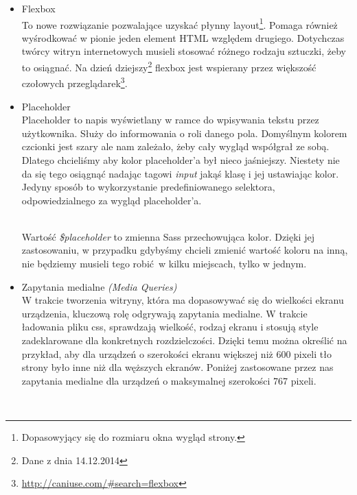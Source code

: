         \begin{itemize}
          \item Flexbox\\
            To nowe rozwiązanie pozwalające uzyskać płynny layout\footnote{Dopasowyjący się do rozmiaru okna wygląd strony.}. Pomaga również wyśrodkować w pionie jeden element HTML względem drugiego. Dotychczas twórcy witryn internetowych musieli stosować różnego rodzaju sztuczki, żeby to osiągnać. Na dzień dziejszy\footnote{Dane z dnia 14.12.2014} flexbox jest wspierany przez większość czołowych przeglądarek\footnote{\url{http://caniuse.com/\#search=flexbox}}. \\
            
            \clearpage
          \item Placeholder\\
            Placeholder to napis wyświetlany w ramce do wpisywania tekstu przez użytkownika. Służy do informowania o roli danego pola. Domyślnym kolorem czcionki jest szary ale nam zależało, żeby cały wygląd współgrał ze sobą. Dlatego chcieliśmy aby kolor placeholder'a był nieco jaśniejszy. Niestety nie da się tego osiągnąć nadając tagowi \emph{input} jakąś klasę i jej ustawiając kolor. Jedyny sposób to wykorzystanie predefiniowanego selektora, odpowiedzialnego za wygląd placeholder'a.

            \begin{code}
              
            \end{code}\\

            Wartość \emph{\$placeholder} to zmienna Sass przechowująca kolor. Dzięki jej zastosowaniu, w przypadku gdybyśmy chcieli zmienić wartość koloru na inną, nie będziemy musieli tego robić w kilku miejscach, tylko w jednym.

          \item Zapytania medialne \emph{(Media Queries)}\\ 
            W trakcie tworzenia witryny, która ma dopasowywać się do wielkości ekranu urządzenia, kluczową rolę odgrywają zapytania medialne. W trakcie ładowania pliku css, sprawdzają wielkość, rodzaj ekranu i stosują style zadeklarowane dla konkretnych rozdzielczości. Dzięki temu można określić na przykład, aby dla urządzeń o szerokości ekranu większej niż 600 pixeli tło strony było inne niż dla węższych ekranów.
            Poniżej zastosowane przez nas zapytania medialne dla urządzeń o maksymalnej szerokości 767 pixeli.
            \begin{code}
              
            \end{code}\\
        \end{itemize}

